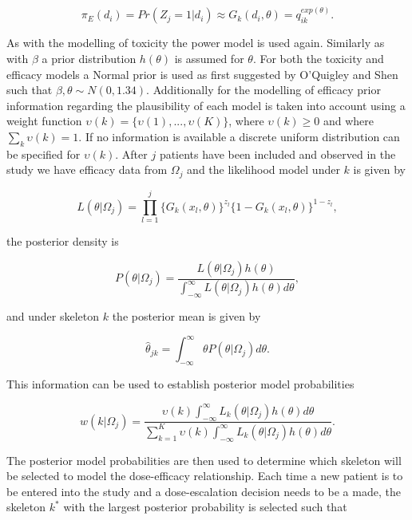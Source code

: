 \begin{equation}
	\pi_E(d_i) = Pr(Z_j = 1|d_i) \approx G_k(d_i,\theta) = q_{ik} ^{exp(\theta)}.
\end{equation}

As with the modelling of toxicity the power model is used again. Similarly as with $\beta$ a prior distribution $h(\theta)$ is assumed for $\theta$. For both the toxicity and efficacy models a Normal prior is used as first suggested by O'Quigley and Shen \cite{oquigleyContinualReassessmentMethod1996} such that $\beta, \theta \sim N(0,1.34)$. Additionally for the modelling of efficacy prior information regarding the plausibility of each model is taken into account using a weight function $\upsilon(k) = \{\upsilon(1), ..., \upsilon(K)\}$, where $\upsilon(k) \geq 0$ and where $\sum_k \upsilon(k) = 1$. If no information is available a discrete uniform distribution can be specified for $\upsilon(k)$. After $j$ patients have been included and observed in the study we have efficacy data from $\Omega_j$ and the likelihood model under $k$ is given by 

\begin{equation}
	L(\theta|\Omega_j)=\prod_{l=1}^{j}\{G_k(x_l,\theta)\}^{z_l}\{1-G_k(x_l,\theta)\}^{1-z_l},  
\end{equation}

the posterior density is 

\begin{equation}
	P(\theta|\Omega_j) = \frac{L(\theta|\Omega_j)h(\theta)}{\int_{-\infty}^{\infty}L(\theta|\Omega_j)h(\theta)d\theta},
\end{equation}

and under skeleton $k$ the posterior mean is given by 

\begin{equation}
	\hat{\theta}_{jk} = \int_{-\infty}^{\infty}\theta P(\theta|\Omega_j)d\theta.
\end{equation} 

This information can be used to establish posterior model probabilities 

\begin{equation}
	w(k|\Omega_j) = \frac{\upsilon(k)\int_{-\infty}^{\infty}L_k(\theta|\Omega_j)h(\theta)d\theta}{\sum_{k=1}^{K}\upsilon(k)\int_{-\infty}^{\infty}L_k(\theta|\Omega_j)h(\theta)d\theta}.
\end{equation}

The posterior model probabilities are then used to determine which skeleton will be selected to model the dose-efficacy relationship. Each time a new patient is to be entered into the study and a dose-escalation decision needs to be a made, the skeleton $k^*$ with the largest posterior probability is selected such that

